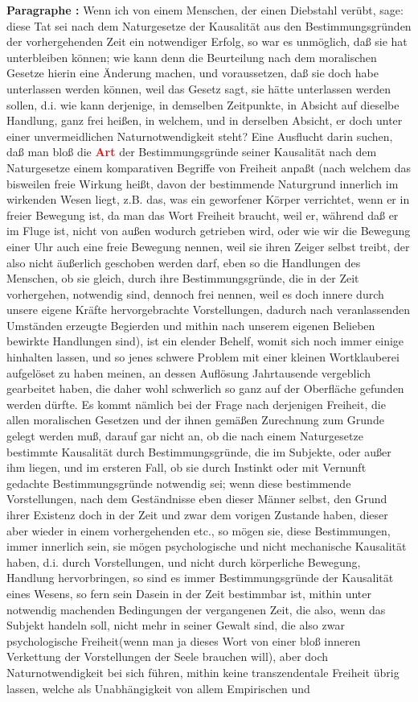 \documentclass[a4paper,12pt,twoside]{book}
\newcommand{\match}[1]{\textcolor{red}{\textbf{#1}}}
\begin{document}
	\noindent\textbf{Paragraphe : }Wenn ich von einem Menschen, der einen Diebstahl verübt, sage: diese Tat sei nach dem Naturgesetze der Kausalität aus den Bestimmungsgründen der vorhergehenden Zeit ein notwendiger Erfolg, so war es unmöglich, daß sie hat unterbleiben können; wie kann denn die Beurteilung nach dem moralischen Gesetze hierin eine Änderung machen, und voraussetzen, daß sie doch habe unterlassen werden können, weil das Gesetz sagt, sie hätte unterlassen werden sollen, d.i. wie kann derjenige, in demselben Zeitpunkte, in Absicht auf dieselbe Handlung, ganz frei heißen, in welchem, und in  derselben Absicht, er doch unter einer unvermeidlichen Naturnotwendigkeit steht? Eine Ausflucht darin suchen, daß man bloß die \match{Art} der Bestimmungsgründe seiner Kausalität nach dem Naturgesetze einem komparativen Begriffe von Freiheit anpaßt (nach welchem das bisweilen freie Wirkung heißt, davon der bestimmende Naturgrund innerlich im wirkenden Wesen liegt, z.B. das, was ein geworfener Körper verrichtet, wenn er in freier Bewegung ist, da man das Wort Freiheit braucht, weil er, während daß er im Fluge ist, nicht von außen wodurch getrieben wird, oder wie wir die Bewegung einer Uhr auch eine freie Bewegung nennen, weil sie ihren Zeiger selbst treibt, der also nicht äußerlich geschoben werden darf, eben so die Handlungen des Menschen, ob sie gleich, durch ihre Bestimmungsgründe, die in der Zeit vorhergehen, notwendig sind, dennoch frei nennen, weil es doch innere durch unsere eigene Kräfte hervorgebrachte Vorstellungen, dadurch nach veranlassenden Umständen erzeugte Begierden und mithin nach unserem eigenen Belieben bewirkte Handlungen sind), ist ein elender Behelf, womit sich noch immer einige hinhalten lassen, und so jenes schwere Problem mit einer kleinen Wortklauberei aufgelöset zu haben meinen, an dessen Auflösung Jahrtausende vergeblich gearbeitet haben, die daher wohl schwerlich so ganz auf der Oberfläche gefunden werden dürfte. Es kommt nämlich bei der Frage nach derjenigen Freiheit, die allen moralischen Gesetzen und der ihnen gemäßen Zurechnung zum Grunde gelegt werden muß, darauf gar nicht an, ob die nach einem Naturgesetze bestimmte Kausalität durch Bestimmungsgründe, die im Subjekte, oder außer ihm liegen, und im ersteren Fall, ob sie durch Instinkt oder mit Vernunft gedachte Bestimmungsgründe notwendig sei; wenn diese bestimmende Vorstellungen, nach dem Geständnisse eben dieser Männer selbst, den Grund ihrer Existenz doch in der Zeit und zwar dem vorigen Zustande haben, dieser aber wieder in einem vorhergehenden etc., so mögen sie, diese Bestimmungen, immer innerlich sein, sie mögen psychologische und nicht mechanische Kausalität haben, d.i. durch Vorstellungen, und nicht durch körperliche Bewegung,  Handlung hervorbringen, so sind es immer Bestimmungsgründe der Kausalität eines Wesens, so fern sein Dasein in der Zeit bestimmbar ist, mithin unter notwendig machenden Bedingungen der vergangenen Zeit, die also, wenn das Subjekt handeln soll, nicht mehr in seiner Gewalt sind, die also zwar psychologische Freiheit(wenn man ja dieses Wort von einer bloß inneren Verkettung der Vorstellungen der Seele brauchen will), aber doch Naturnotwendigkeit bei sich führen, mithin keine transzendentale Freiheit übrig lassen, welche als Unabhängigkeit von allem Empirischen und 
\end{document}
